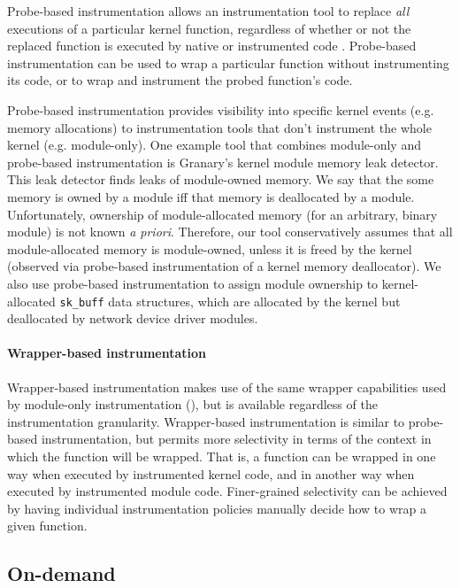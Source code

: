 \documentclass[preprint]{sigplanconf}
\begin{document}
Probe-based instrumentation allows an instrumentation tool to replace \emph{all} executions of a particular kernel function, regardless of whether or not the replaced function is executed by native or instrumented code \cite{KProbes, AnyWhereAnyTimeDBT, KernInst}. Probe-based instrumentation can be used to wrap a particular function without instrumenting its code, or to wrap and instrument the probed function's code.

Probe-based instrumentation provides visibility into specific kernel events (e.g. memory allocations) to instrumentation tools that don't instrument the whole kernel (e.g. module-only). One example tool that combines module-only and probe-based instrumentation is Granary's kernel module memory leak detector. This leak detector finds leaks of module-owned memory. We say that the some memory is owned by a module iff that memory is deallocated by a module. Unfortunately, ownership of module-allocated memory (for an arbitrary, binary module) is not known \emph{a priori}. Therefore, our tool conservatively assumes that all module-allocated memory is module-owned, unless it is freed by the kernel (observed via probe-based instrumentation of a kernel memory deallocator). We also use probe-based instrumentation to assign module ownership to kernel-allocated \texttt{sk\_buff} data structures, which are allocated by the kernel but deallocated by network device driver modules.

\paragraph{Wrapper-based instrumentation}

Wrapper-based instrumentation makes use of the same wrapper capabilities used by module-only instrumentation (), but is available regardless of the instrumentation granularity. Wrapper-based instrumentation is similar to probe-based instrumentation, but permits more selectivity in terms of the context in which the function will be wrapped. That is, a function can be wrapped in one way when executed by instrumented kernel code, and in another way when executed by instrumented module code. Finer-grained selectivity can be achieved by having individual instrumentation policies manually decide how to wrap a given function.

\subsection{On-demand}
\end{document}

